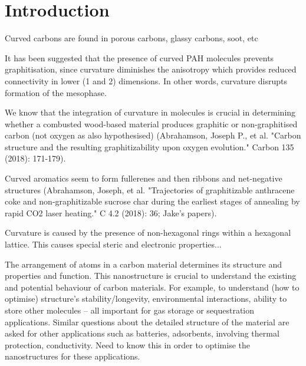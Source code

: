 \newcommand{\curPAHAP}{curPAHIP\xspace} 
%
\section{Introduction}
\label{sec:Introduction}

Curved carbons are found in porous carbons, glassy carbons, soot, etc

It has been suggested that the presence of curved PAH molecules prevents graphitisation, since curvature diminishes the anisotropy which provides reduced connectivity in lower (1 and 2) dimensions. In other words, curvature disrupts formation of the mesophase.

We know that the integration of curvature in molecules is crucial in determining whether a combusted wood-based material produces graphitic or non-graphitised carbon (not oxygen as also hypothesised) (Abrahamson, Joseph P., et al. "Carbon structure and the resulting graphitizability upon oxygen evolution." Carbon 135 (2018): 171-179).

Curved aromatics seem to form fullerenes and then ribbons and net-negative structures (Abrahamson, Joseph, et al. "Trajectories of graphitizable anthracene coke and non-graphitizable sucrose char during the earliest stages of annealing by rapid CO2 laser heating." C 4.2 (2018): 36; Jake's papers).


Curvature is caused by the presence of non-hexagonal rings within a hexagonal lattice. This causes special steric and electronic properties...

The arrangement of atoms in a carbon material determines its structure and properties and function. This nanostructure is crucial to understand the existing and potential behaviour of carbon materials. For example, to understand (how to optimise) structure's stability/longevity, environmental interactions, ability to store other molecules -- all important for gas storage or sequestration applications.  Similar questions about the detailed structure of the material are asked for other applications such as batteries, adsorbents, involving thermal protection, conductivity.
Need to know this in order to optimise the nanostructures for these applications.

